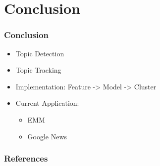 \documentclass{beamer}
\begin{document}
\section{Conclusion}
\begin{frame}
	\frametitle{Conclusion}
	\begin{itemize}
		\item Topic Detection
		\item Topic Tracking
		\item Implementation: Feature -> Model -> Cluster
		\item Current Application:
			\begin{itemize}
				\item EMM
				\item Google News
			\end{itemize}
	\end{itemize}
\end{frame}

\begin{frame}
	\frametitle{References}
	\footnotesize{
		
		
	}
\end{frame}
\end{document}
